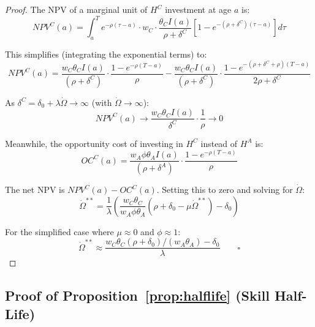 \documentclass[11pt,a4paper]{article}
\theoremstyle{definition}
\begin{document}
\begin{proof}
The NPV of a marginal unit of $H^C$ investment at age $a$ is:
\begin{equation}
NPV^C(a) = \int_a^T e^{-\rho(\tau-a)} \cdot w_C \cdot \frac{\theta_C I(a)}{\rho + \delta^C} \left[ 1 - e^{-(\rho+\delta^C)(\tau - a)} \right] d\tau
\end{equation}

This simplifies (integrating the exponential terms) to:
\begin{equation}
NPV^C(a) = \frac{w_C \theta_C I(a)}{(\rho + \delta^C)} \cdot \frac{1 - e^{-\rho(T-a)}}{\rho} - \frac{w_C \theta_C I(a)}{(\rho + \delta^C)} \cdot \frac{1 - e^{-(\rho+\delta^C+\rho)(T-a)}}{2\rho + \delta^C}
\end{equation}

As $\delta^C = \delta_0 + \lambda \dot{\Omega} \to \infty$ (with $\dot{\Omega} \to \infty$):
\begin{equation}
NPV^C(a) \to \frac{w_C \theta_C I(a)}{\delta^C} \cdot \frac{1}{\rho} \to 0
\end{equation}

Meanwhile, the opportunity cost of investing in $H^C$ instead of $H^A$ is:
\begin{equation}
OC^C(a) = \frac{w_A \phi \theta_A I(a)}{(\rho + \delta^A)} \cdot \frac{1 - e^{-\rho(T-a)}}{\rho}
\end{equation}

The net NPV is $NPV^C(a) - OC^C(a)$. Setting this to zero and solving for $\dot{\Omega}$:
\begin{equation}
\dot{\Omega}^{**} = \frac{1}{\lambda} \left( \frac{w_C \theta_C}{w_A \phi \theta_A} (\rho + \delta_0 - \mu \dot{\Omega}^{**}) - \delta_0 \right)
\end{equation}

For the simplified case where $\mu \approx 0$ and $\phi \approx 1$:
\begin{equation}
\dot{\Omega}^{**} \approx \frac{w_C \theta_C (\rho + \delta_0) / (w_A \theta_A) - \delta_0}{\lambda} \qquad \square
\end{equation}
\end{proof}

\subsection{Proof of Proposition~\ref{prop:halflife} (Skill Half-Life)}
\end{document}
